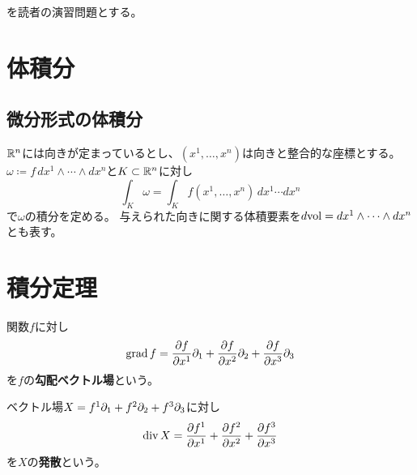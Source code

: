 \documentclass[report]{jlreq}
\begin{document}
\begin{problem}[面積分]
    \cite[第IV章 問題6.3 (1)-(10)]{杉浦+89}を読者の演習問題とする。
\end{problem}




%
\section{体積分}
\subsection{微分形式の体積分}

\begin{definition}[微分形式の体積分]
    $\mathbb{R}^n$には向きが定まっているとし、$(x^1, \dots, x^n)$は向きと整合的な座標とする。
    $\omega \coloneqq f\, dx^1 \wedge \cdots \wedge dx^n$と$K \subset \mathbb{R}^n$に対し
    \begin{equation}
        \int_K \omega
            = \int_K f(x^1, \dots, x^n)\, dx^1 \cdots dx^n
    \end{equation}
    で$\omega$の積分を定める。
    与えられた向きに関する体積要素を$d\mathrm{vol} = dx^1 \wedge \cdots \wedge dx^n$とも表す。
\end{definition}






%
\section{積分定理}

\begin{definition}[勾配]
    関数$f$に対し
    \begin{equation}
        \Grad f
            = \deldel[f]{x^1} \del_1
            + \deldel[f]{x^2} \del_2
            + \deldel[f]{x^3} \del_3
    \end{equation}
    を$f$の\textbf{勾配ベクトル場}という。
\end{definition}

\begin{definition}[発散]
    ベクトル場$X = f^1 \partial_1 + f^2 \partial_2 + f^3 \partial_3$に対し
    \begin{equation}
        \Div X
            = \deldel[f^1]{x^1}
            + \deldel[f^2]{x^2}
            + \deldel[f^3]{x^3}
    \end{equation}
    を$X$の\textbf{発散}という。
\end{definition}
\end{document}
